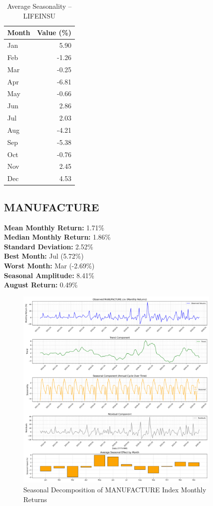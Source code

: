 \documentclass[12pt]{article}
\begin{document}
\begin{table}[h!]
\centering
\caption{Average Seasonality -- LIFEINSU}
\begin{tabular}{l r}
\toprule
Month & Value (\%) \\
\midrule
Jan & 5.90 \\
Feb & -1.26 \\
Mar & -0.25 \\
Apr & -6.81 \\
May & -0.66 \\
Jun & 2.86 \\
Jul & 2.03 \\
Aug & -4.21 \\
Sep & -5.38 \\
Oct & -0.76 \\
Nov & 2.45 \\
Dec & 4.53 \\
\bottomrule
\end{tabular}
\end{table}


\clearpage

\subsection{MANUFACTURE}
\textbf{Mean Monthly Return:} 1.71\% \\
\textbf{Median Monthly Return:} 1.86\% \\
\textbf{Standard Deviation:} 2.52\% \\
\textbf{Best Month:} Jul (5.72\%) \\
\textbf{Worst Month:} Mar (-2.69\%) \\
\textbf{Seasonal Amplitude:} 8.41\% \\
\textbf{August Return:} 0.49\% \\

\begin{figure}[h!]
    \centering
    \includegraphics[width=0.9\textwidth]{decomposition_outputs/MANUFACTURE_seasonal_decomposition.png}
    \caption{Seasonal Decomposition of MANUFACTURE Index Monthly Returns}
\end{figure}
\end{document}
